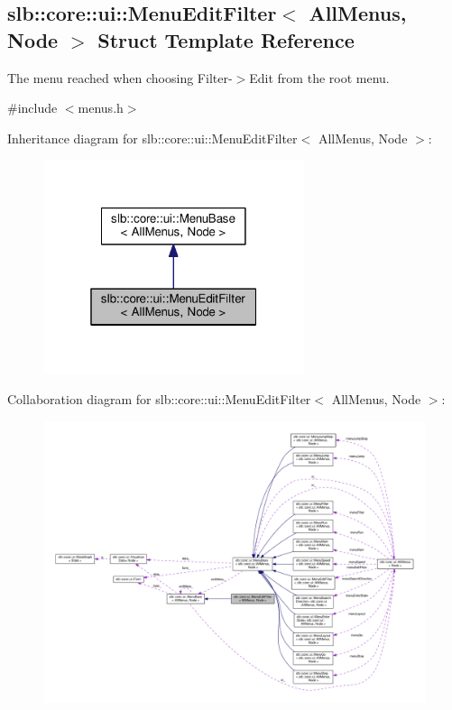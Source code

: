 \hypertarget{structslb_1_1core_1_1ui_1_1MenuEditFilter}{}\subsection{slb\+:\+:core\+:\+:ui\+:\+:Menu\+Edit\+Filter$<$ All\+Menus, Node $>$ Struct Template Reference}
\label{structslb_1_1core_1_1ui_1_1MenuEditFilter}


The menu reached when choosing Filter-\/$>$Edit from the root menu.  




{\ttfamily \#include $<$menus.\+h$>$}



Inheritance diagram for slb\+:\+:core\+:\+:ui\+:\+:Menu\+Edit\+Filter$<$ All\+Menus, Node $>$\+:\nopagebreak
\begin{figure}[H]
\begin{center}
\leavevmode
\includegraphics[width=217pt]{structslb_1_1core_1_1ui_1_1MenuEditFilter__inherit__graph}
\end{center}
\end{figure}


Collaboration diagram for slb\+:\+:core\+:\+:ui\+:\+:Menu\+Edit\+Filter$<$ All\+Menus, Node $>$\+:\nopagebreak
\begin{figure}[H]
\begin{center}
\leavevmode
\includegraphics[width=350pt]{structslb_1_1core_1_1ui_1_1MenuEditFilter__coll__graph}
\end{center}
\end{figure}
